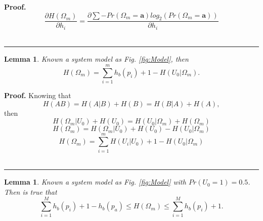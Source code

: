 \documentclass[a4paper,10pt]{article}
\newtheorem{mylemma}[mytheorem]{Lemma}
\newenvironment{myproof}[1][Proof]{\textbf{#1.} }{\ \rule{0.5em}{0.5em}}
\begin{document}
\begin{myproof}
 \label{proof:dH} 
\begin{equation}\label{eq:dH2}
 \frac{\partial H(\Omega_m)}{\partial h_i} =\frac{\partial \sum -Pr(\Omega_m=\mathbf{a}) log_2(Pr(\Omega_m=\mathbf{a}))}{\partial h_i} 
\end{equation}
\end{myproof}
\begin{mdframed}[style=MDFStyGrayScreen]
\begin{mylemma}
 \label{lemm:H}
 Known a system model as Fig. \ref{fig:Model}, then
  \begin{equation}\label{eq:H}
H(\Omega_m) = \sum_{i=1}^{m}{h_b(p_i)}+1-H(U_0|\Omega_m).
\end{equation}
\end{mylemma}
\end{mdframed}

\begin{myproof}
 \label{proof:H}
 Knowing that
 \begin{equation}\label{eq:H1}
H(A B)=H(A|B)+H(B)=H(B|A)+H(A),
\end{equation}
then
 \begin{equation}\label{eq:H2}
H(\Omega_m|U_0)+H(U_0)=H(U_0|\Omega_m)+H(\Omega_m)
\end{equation}
 \begin{equation}\label{eq:H3}
H(\Omega_m) = H(\Omega_m|U_0)+H(U_0)-H(U_0|\Omega_m)
\end{equation}
 \begin{equation}\label{eq:H4}
H(\Omega_m) = \sum_{i=1}^{m}{H(U_i|U_0)}+1-H(U_0|\Omega_m)
\end{equation}
\end{myproof}
\begin{mdframed}[style=MDFStyGrayScreen]
\begin{mylemma}
 \label{lemm:Hin}
 Known a system model as Fig. \ref{fig:Model} with $Pr(U_0=1)=0.5$. Then is true that
  \begin{equation}\label{eq:Hin}
\sum_{i=1}^{M}{h_b(p_i)}+1-h_b(p_a) \leq H(\Omega_m) \leq \sum_{i=1}^{M}{h_b(p_i)}+1.
\end{equation}
\end{mylemma}
\end{mdframed}
\end{document}
